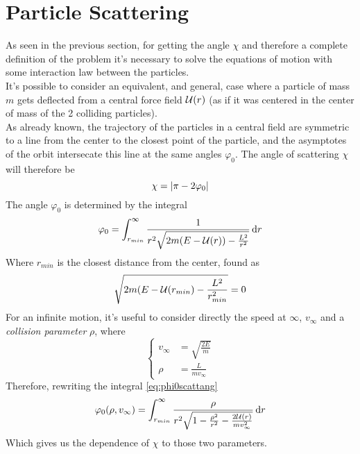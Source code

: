 \documentclass[../admech.tex]{subfiles}
\begin{document}
\section{Particle Scattering}
As seen in the previous section, for getting the angle $\chi$ and therefore a complete definition of the problem it's necessary to solve the equations of motion with some interaction law between the particles.\\
It's possible to consider an equivalent, and general, case where a particle of mass $m$ gets deflected from a central force field $\mathcal{U}(r)$ (as if it was centered in the center of mass of the 2 colliding particles).\\
As already known, the trajectory of the particles in a central field are symmetric to a line from the center to the closest point of the particle, and the asymptotes of the orbit intersecate this line at the same angles $\varphi_0$. The angle of scattering $\chi$ will therefore be
\begin{equation}
	\chi=\abs{\pi-2\varphi_0}
	\label{eq:scattang0}
\end{equation}
The angle $\varphi_0$ is determined by the integral
\begin{equation}
	\varphi_0=\int_{r_{min}}^{\infty}\frac{1}{r^2\sqrt{2m(E-\mathcal{U}(r))-\frac{L^2}{r^2}}}\dd{r}
	\label{eq:phi0scattang}
\end{equation}
Where $r_{min}$ is the closest distance from the center, found as
\begin{equation}
	\sqrt{2m(E-\mathcal{U}(r_{min})-\frac{L^2}{r_{min}^2}}=0
	\label{eq:mindistscattang}
\end{equation}
For an infinite motion, it's useful to consider directly the speed at $\infty$, $v_\infty$ and a \emph{collision parameter} $\rho$, where
\begin{equation}
	\left\{ \begin{aligned}
			v_\infty&=\sqrt{\frac{2E}{m}}\\
			\rho&=\frac{L}{mv_\infty}
	\end{aligned}\right.
	\label{eq:vinfrhoscatt}
\end{equation}
Therefore, rewriting the integral \eqref{eq:phi0scattang}
\begin{equation}
	\varphi_0(\rho,v_\infty)=\int_{r_{min}}^{\infty}\frac{\rho}{r^2\sqrt{1-\frac{\rho^2}{r^2}-\frac{2\mathcal{U}(r)}{mv_\infty^2}}}\dd{r}
	\label{eq:phi0new}
\end{equation}
Which gives us the dependence of $\chi$ to those two parameters.\\
\end{document}
